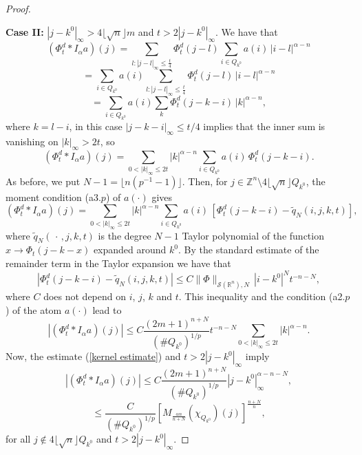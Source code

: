\documentclass[leqno,12pt]{article} %
\theoremstyle{plain} %
\theoremstyle{definition} %
\begin{document}
\begin{proof}
\

{\bf Case II:} $|j - k^0 |_{\infty} > 4 \lfloor \sqrt{n} \rfloor m$ and $t > 2 |j - k^0 |_{\infty}$. We have that
\[
(\Phi_t^d \ast I_{\alpha}a)(j) = \sum_{l : |j-l|_{\infty} \leq \frac{t}{4}} \Phi^{d}_{t}(j-l) \sum_{i \in Q_{k^0}} a(i) \, |i-l|^{\alpha-n}
\]
\[
= \sum_{i \in Q_{k^0}} a(i) \sum_{l : |j-l|_{\infty} \leq \frac{t}{4}} \Phi^{d}_{t}(j-l) \, |i-l|^{\alpha-n}
\]
\[
= \sum_{i \in Q_{k^0}} a(i) \sum_{k} \Phi^{d}_{t}(j- k -i) \, |k|^{\alpha-n},
\]
where $k = l - i$, in this case $|j-k-i|_{\infty} \leq t/4$ implies that the inner sum is vanishing on $|k|_{\infty} > 2t$, so
\[
(\Phi_t^d \ast I_{\alpha}a)(j) = \sum_{0 < |k|_{\infty} \leq 2t} |k|^{\alpha-n} \sum_{i \in Q_{k^0}} a(i) \, \Phi^{d}_{t}(j- k -i).
\]
As before, we put $N - 1 = \lfloor n(p^{-1} - 1) \rfloor$. Then, for $j \in \mathbb{Z}^n \setminus 4 \lfloor \sqrt{n} \rfloor Q_{k^0}$, the moment condition (a3.$p$) of $a(\cdot)$ gives
\[
(\Phi_t^d \ast I_{\alpha}a)(j) = \sum_{0< |k|_{\infty} \leq 2t} |k|^{\alpha-n} \sum_{i \in Q_{k^0}} a(i) \, 
\left[\Phi^{d}_{t}(j- k -i) - \widetilde{q}_N(i, j, k, t) \right],
\]
where $\widetilde{q}_N(\, \cdot \,, j, k, t)$ is the degree $N - 1$ Taylor polynomial of the function $x \rightarrow \Phi_{t}(j- k -x)$ expanded around $k^0$. By the standard estimate of the remainder term in the Taylor expansion we have that
\[
\left| \Phi^{d}_{t}(j- k -i) - \widetilde{q}_N(i, j, k, t) \right| \leq C \| \Phi \|_{\mathcal{S}(\mathbb{R}^n), N} \, |i - k^0|^{N} t^{-n-N},
\]
where $C$ does not depend on $i$, $j$, $k$ and $t$. This inequality and the condition (a2.$p$) of the atom $a(\cdot)$ lead to
\[
\left|(\Phi_t^d \ast I_{\alpha}a)(j)\right| \leq C \frac{(2m+1)^{n+N}}{(\# Q_{k^0})^{1/p}}t^{-n-N}\sum_{0 < |k|_{\infty} \leq 2t} |k|^{\alpha-n}.
\]
Now, the estimate (\ref{kernel estimate}) and $t > 2 |j - k^0 |_{\infty}$ imply
\[
\left|(\Phi_t^d \ast I_{\alpha}a)(j)\right| \leq C \frac{(2m+1)^{n+N}}{(\# Q_{k^0})^{1/p}} |j - k^0 |_{\infty}^{\alpha-n-N},
\]
\[
\leq \frac{C}{(\# Q_{k^0})^{1/p}} 
\left[ M_{\frac{\alpha n}{n+N}} (\chi_{Q_{k^0}})(j) \right]^{\frac{n+N}{n}},
\]
for all $j \notin 4 \lfloor \sqrt{n} \rfloor Q_{k^0}$ and $t > 2 |j - k^0 |_{\infty}$. 


\end{proof}
\end{document}
